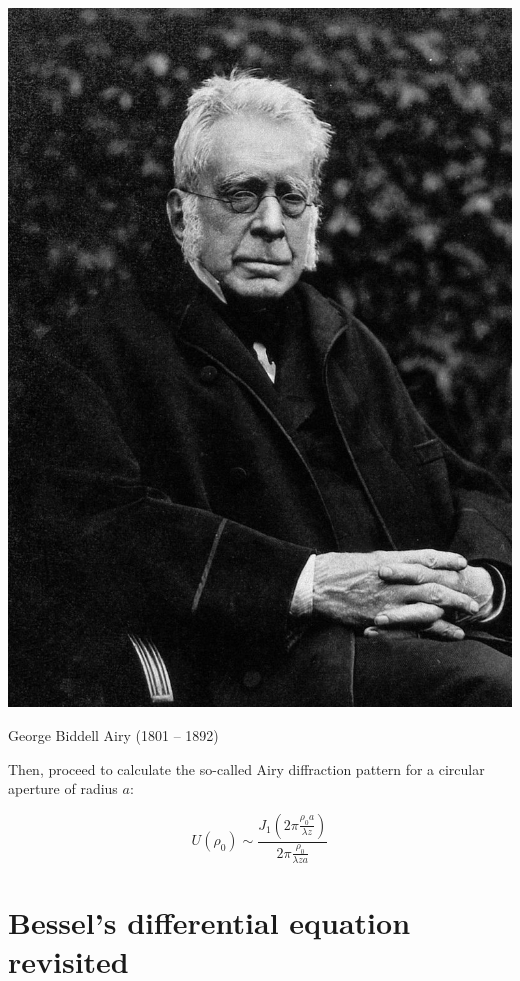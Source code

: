 \begin{exer}
\begin{marginfigure}[-5cm]
  \includegraphics{bessel/figures/g_airy}
  \caption{George Biddell Airy (1801 – 1892)}
\end{marginfigure}

Then, proceed to calculate the so-called Airy diffraction pattern for a circular aperture of radius $a$:

$$U(\rho_0) \sim \frac {J_1\left( 2 \pi \frac {\rho_0 a}{\lambda z} \right)}{ 2 \pi \frac{\rho_0}{\lambda z a}}$$

\end{exer}


\section{Bessel's differential equation revisited}

